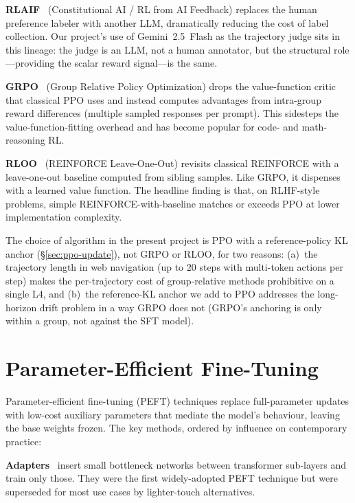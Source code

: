\documentclass[12pt,a4paper]{report}
\begin{document}
\textbf{RLAIF}~\cite{bai2022constitutional} (Constitutional AI / RL from AI Feedback) replaces the human preference labeler with another LLM, dramatically reducing the cost of label collection. Our project's use of Gemini~2.5~Flash as the trajectory judge sits in this lineage: the judge is an LLM, not a human annotator, but the structural role---providing the scalar reward signal---is the same.

\textbf{GRPO}~\cite{shao2024deepseekmath} (Group Relative Policy Optimization) drops the value-function critic that classical PPO uses and instead computes advantages from intra-group reward differences (multiple sampled responses per prompt). This sidesteps the value-function-fitting overhead and has become popular for code- and math-reasoning RL.

\textbf{RLOO}~\cite{ahmadian2024rloo} (REINFORCE Leave-One-Out) revisits classical REINFORCE with a leave-one-out baseline computed from sibling samples. Like GRPO, it dispenses with a learned value function. The headline finding is that, on RLHF-style problems, simple REINFORCE-with-baseline matches or exceeds PPO at lower implementation complexity.

The choice of algorithm in the present project is PPO with a reference-policy KL anchor (\S\ref{sec:ppo-update}), not GRPO or RLOO, for two reasons: (a)~the trajectory length in web navigation (up to 20 steps with multi-token actions per step) makes the per-trajectory cost of group-relative methods prohibitive on a single L4, and (b)~the reference-KL anchor we add to PPO addresses the long-horizon drift problem in a way GRPO does not (GRPO's anchoring is only within a group, not against the SFT model).

\section{Parameter-Efficient Fine-Tuning}\label{sec:lit-peft}

Parameter-efficient fine-tuning (PEFT) techniques replace full-parameter updates with low-cost auxiliary parameters that mediate the model's behaviour, leaving the base weights frozen. The key methods, ordered by influence on contemporary practice:

\textbf{Adapters}~\cite{houlsby2019adapters} insert small bottleneck networks between transformer sub-layers and train only those. They were the first widely-adopted PEFT technique but were superseded for most use cases by lighter-touch alternatives.
\end{document}
